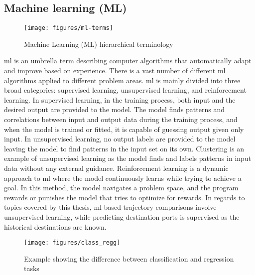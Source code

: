 \subsection{Machine learning (ML)}
\label{sec:machine_learning}

\begin{figure}[htbp]  %
    \centering
    \texttt{[image: figures/ml-terms]}
    \caption{Machine Learning (ML) hierarchical terminology}
    \label{fig:ml_terms}
\end{figure}

\acrfull{ml} is an umbrella term describing computer algorithms that automatically adapt and improve based on experience. There is a vast number of different \acrshort{ml} algorithms applied to different problem areas. \acrshort{ml} is mainly divided into three broad categories: supervised learning, unsupervised learning, and reinforcement learning. In supervised learning, in the training process, both input and the desired output are provided to the model. The model finds patterns and correlations between input and output data during the training process, and when the model is trained or fitted, it is capable of guessing output given only input. In unsupervised learning, no output labels are provided to the model leaving the model to find patterns in the input set on its own. Clustering is an example of unsupervised learning as the model finds and labels patterns in input data without any external guidance. Reinforcement learning is a dynamic approach to \acrshort{ml} where the model continuously learns while trying to achieve a goal. In this method, the model navigates a problem space, and the program rewards or punishes the model that tries to optimize for rewards. In regards to topics covered by this thesis, \acrshort{ml}-based trajectory comparisons involve unsupervised learning, while predicting destination ports is supervised as the historical destinations are known.

\begin{figure}[htbp]  %
    \centering
    \texttt{[image: figures/class\_regg]}
    \caption{Example showing the difference between classification and regression tasks}
    \label{fig:classification_regression}
\end{figure}

